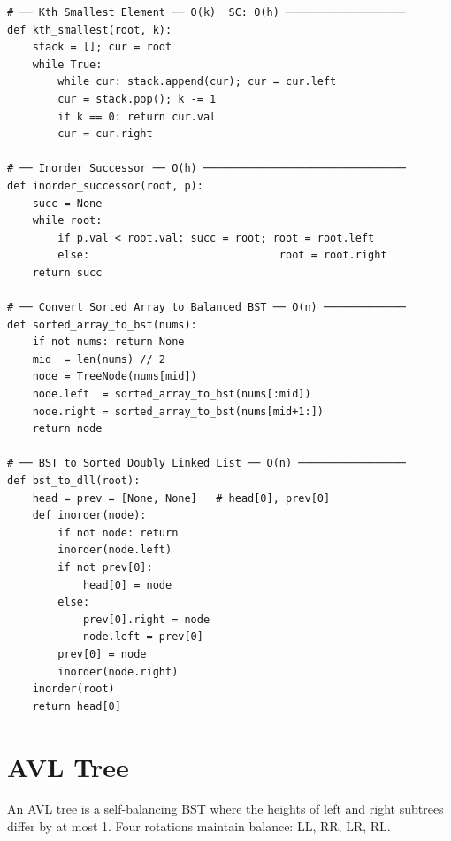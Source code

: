 \documentclass[11pt,a4paper]{report}
\begin{document}
\begin{lstlisting}
# ── Kth Smallest Element ── O(k)  SC: O(h) ───────────────────
def kth_smallest(root, k):
    stack = []; cur = root
    while True:
        while cur: stack.append(cur); cur = cur.left
        cur = stack.pop(); k -= 1
        if k == 0: return cur.val
        cur = cur.right

# ── Inorder Successor ── O(h) ────────────────────────────────
def inorder_successor(root, p):
    succ = None
    while root:
        if p.val < root.val: succ = root; root = root.left
        else:                              root = root.right
    return succ

# ── Convert Sorted Array to Balanced BST ── O(n) ─────────────
def sorted_array_to_bst(nums):
    if not nums: return None
    mid  = len(nums) // 2
    node = TreeNode(nums[mid])
    node.left  = sorted_array_to_bst(nums[:mid])
    node.right = sorted_array_to_bst(nums[mid+1:])
    return node

# ── BST to Sorted Doubly Linked List ── O(n) ─────────────────
def bst_to_dll(root):
    head = prev = [None, None]   # head[0], prev[0]
    def inorder(node):
        if not node: return
        inorder(node.left)
        if not prev[0]:
            head[0] = node
        else:
            prev[0].right = node
            node.left = prev[0]
        prev[0] = node
        inorder(node.right)
    inorder(root)
    return head[0]
\end{lstlisting}

\section{AVL Tree}

An AVL tree is a self-balancing BST where the heights of left and right subtrees differ by at most 1.
Four rotations maintain balance: LL, RR, LR, RL.
\end{document}

